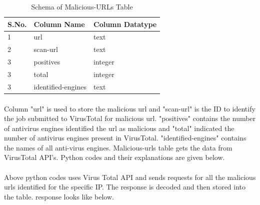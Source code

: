 \documentclass{report}
\begin{document}
\begin{table}[H]
\begin{tabular}{ |p{2cm}|p{5cm}|p{5cm}|  }
 \hline
 \textbf{S.No.} & \textbf{Column Name} & \textbf{Column Datatype}\\
 \hline
 \hline
 1 & url & text \\
 \hline
2 & scan-url & text \\
\hline
3 & positives & integer \\
\hline
3 & total & integer \\
\hline
3 & identified-engines & text \\
\hline
\end{tabular}
 \caption{Schema of Malicious-URLs Table}
\end{table}

\paragraph{}
Column "url" is used to store the malicious url and "scan-url" is the ID to identify the job submitted to VirusTotal for malicious url. "positives" contains the number of antivirus engines identified the url as malicious and   "total" indicated the number of antivirus engines present in VirusTotal. "identified-engines" contains the names of all anti-virus engines. Malicious-urls table gets the data from VirusTotal API's. Python codes and their explanations are given below.

 


 


 


 



\paragraph{}
Above python codes uses Virus Total API and sends requests for all the malicious urls identified for the specific IP. The response is decoded and then stored into the table. response looks like below.
\end{document}
